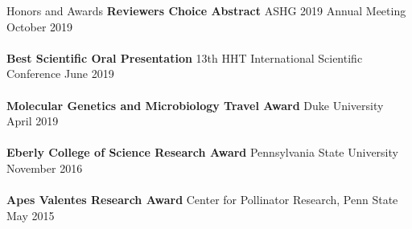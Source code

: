 \documentclass{resume} %
\begin{document}
\begin{rSection}{Honors and Awards}
{\bf Reviewers Choice Abstract} ASHG 2019 Annual Meeting \hfill {October 2019} \\ \\
{\bf Best Scientific Oral Presentation} 13th HHT International Scientific Conference \hfill {June 2019} \\ \\
{\bf Molecular Genetics and Microbiology Travel Award} Duke University \hfill {April 2019} \\ \\
{\bf Eberly College of Science Research Award} Pennsylvania State University \hfill {November 2016} \\ \\
{\bf Apes Valentes Research Award} Center for Pollinator Research, Penn State \hfill {May 2015} 

\end{rSection}
\end{document}

